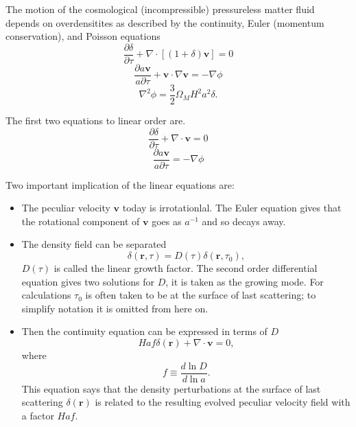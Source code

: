 \documentclass[11pt, oneside]{article}   	%
\begin{document}
The motion of the cosmological (incompressible) pressureless matter
fluid depends on overdensitites as described by the continuity, Euler
(momentum conservation), and Poisson equations
\begin{equation}
\frac{\partial \delta}{\partial \tau} + \nabla \cdot [(1+\delta)\mathbf{v}]=0
\end{equation}
\begin{equation}
\frac{\partial a \mathbf{v}}{a\partial \tau} + \mathbf{v} \cdot \nabla \mathbf{v} = - \nabla \phi
\end{equation}
\begin{equation}
\nabla^2\phi=\frac{3}{2} \Omega_MH^2a^2\delta.
\end{equation}

The first two  equations to linear order are.
\begin{equation}
\frac{\partial \delta}{\partial \tau} + \nabla \cdot \mathbf{v}=0
\end{equation}
\begin{equation}
\frac{\partial a \mathbf{v}}{a\partial \tau} = - \nabla \phi
\end{equation}

Two important implication of the linear equations are:
\begin{itemize}
\item The peculiar velocity $\mathbf{v}$ today is irrotationlal. The Euler equation gives that the rotational component of $\mathbf{v}$ goes as $a^{-1}$ and so decays away.
\item The density field can be separated
\begin{equation}
\delta (\mathbf{r},\tau)  = D(\tau) \delta (\mathbf{r},\tau_0),
\end{equation}
$D(\tau)$ is called the linear growth factor.  The second order differential equation
gives two solutions for $D$, it is taken as the growing mode.
For calculations $\tau_0$ is often taken to be at the surface of last scattering;
to simplify notation it is omitted from here on.
\item Then the continuity equation can be expressed in terms of $D$
\begin{equation}
Haf\delta(\mathbf{r}) + \nabla \cdot \mathbf{v}=0,
\label{rv:eqn}
\end{equation}
where
\begin{equation}
f \equiv \frac{d \ln{D}}{d\ln{a}}.
\end{equation}
This equation says that the density perturbations at the surface of last scattering $\delta(\mathbf{r})$
is related to the resulting evolved peculiar velocity field with a factor $Haf$.
\end{itemize}
\end{document}
